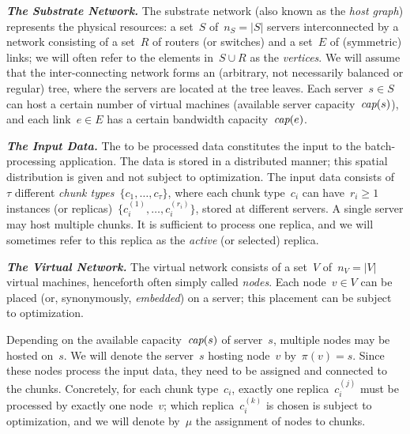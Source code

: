 \documentclass[preprint,12pt]{elsarticle}
\newcommand{\MaFactor}{m}
\newcommand{\ChunkType}{\tau}
\newcommand{\VirtualNodes}{\ensuremath{V}}
\newcommand{\achunk}{\ensuremath{c}}
\newcommand{\capacity}{\emph{cap}}
\begin{document}
\textbf{\emph{The Substrate Network.}} The substrate network (also known as the \emph{host graph}) represents the physical resources:
a set~$S$ of~$n_S=|S|$ servers interconnected by a network consisting of a set~$R$ of routers (or switches)
and a set~$E$ of (symmetric) links; we will often refer to the elements in~$S\cup R$
as the \emph{vertices}. We will assume that the inter-connecting network forms an (arbitrary, not necessarily balanced
or regular) tree,
where the servers are located at the tree leaves.
Each server~$s\in S$ can host a certain number
of virtual machines (available server capacity~$\capacity(s)$), and each link~$e\in E$ has a certain bandwidth
capacity~$\capacity(e)$.

\textbf{\emph{The Input Data.}} The to be processed data constitutes the input to the batch-processing application.
The data is stored in a distributed manner; this spatial distribution is given and not subject to optimization.
The input data consists of~$\tau$ different \emph{chunk types}~$\{\achunk_1, \ldots, \achunk_{\ChunkType}\}$,
where each chunk type~$\achunk_i$ can have~$r_i\geq 1$ instances (or replicas)~$\{\achunk_{i}^{(1)},\ldots, \achunk_{i}^{(r_i)}\}$,
 stored at different servers. A single server may host multiple chunks.
It is sufficient to process one replica, and we will sometimes refer to this
replica as the \emph{active} (or selected) replica.

\textbf{\emph{The Virtual Network.}} The virtual network consists of a set~$\VirtualNodes$ of~$n_V=|\VirtualNodes|$ virtual machines,
henceforth often simply called \emph{nodes}.
Each node~$v \in \VirtualNodes$ can be placed (or, synonymously, \emph{embedded}) on a server; this placement can be subject
to optimization.

Depending on the available capacity~$\capacity(s)$ of server~$s$, multiple nodes may be hosted on~$s$.
We will denote the server~$s$ hosting node~$v$ by~$\pi(v)=s$.
Since these nodes process the input data, they need to be assigned and connected to the
chunks. Concretely, for each chunk type~$\achunk_i$, exactly one
replica~$\achunk_{i}^{(j)}$ must be processed by exactly one node~$v$;
which replica~$\achunk_{i}^{(k)}$ is chosen is subject to optimization, and
we will denote by~$\mu$ the assignment of nodes to chunks.
\end{document}
